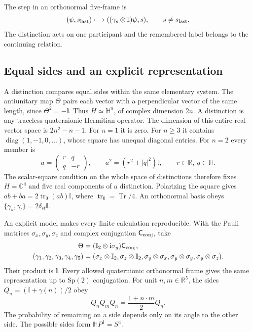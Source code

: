 \documentclass[aps,prx,onecolumn,10pt,notitlepage,nofootinbib,longbibliography]{revtex4-2}
\numberwithin{equation}{section}
\numberwithin{table}{section}
\newcommand{\Id}{\mathbb I}
\newcommand{\CC}{\mathbb C}
\newcommand{\RR}{\mathbb R}
\newcommand{\Tr}{\operatorname{Tr}}
\newcommand{\diag}{\operatorname{diag}}
\newcommand{\ii}{\mathrm i}
\newcommand{\trn}{\operatorname{tr}_0}
\begin{document}
The step in an orthonormal five-frame is
\begin{equation}
 (\psi,s_{\rm last})\longmapsto
 ((\gamma_s\otimes\Id)\psi,s),\qquad s\ne s_{\rm last}.
 \label{eq:postulatestep}
\end{equation}
The distinction acts on one participant and the remembered label belongs to the continuing relation.

\subsection{Equal sides and an explicit representation}
A distinction compares equal sides within the same elementary system. The antiunitary map $\Theta$ pairs each vector with a perpendicular vector of the same length, since $\Theta^2=-\Id$. Thus $H\simeq\mathbb H^n$, of complex dimension $2n$. A distinction is any traceless quaternionic Hermitian operator. The dimension of this entire real vector space is $2n^2-n-1$. For $n=1$ it is zero. For $n\geq3$ it contains $\diag(1,-1,0,\ldots)$, whose square has unequal diagonal entries. For $n=2$ every member is
\begin{equation}
 a=\begin{pmatrix}r&q\\\bar q&-r\end{pmatrix},\qquad
 a^2=(r^2+|q|^2)\Id,\qquad r\in\RR,\ q\in\mathbb H.
 \label{eq:quaternionic}
\end{equation}
The scalar-square condition on the whole space of distinctions therefore fixes $H=\CC^4$ and five real components of a distinction. Polarizing the square gives $ab+ba=2\trn(ab)\Id$, where $\trn=\Tr/4$. An orthonormal basis obeys $\{\gamma_s,\gamma_t\}=2\delta_{st}\Id$.

An explicit model makes every finite calculation reproducible. With the Pauli matrices $\sigma_x,\sigma_y,\sigma_z$ and complex conjugation ${\mathsf C_{\rm conj}}$, take
\begin{align}
 \Theta&=(\Id_2\otimes\ii\sigma_y){\mathsf C_{\rm conj}},\notag\\
 (\gamma_1,\gamma_2,\gamma_3,\gamma_4,\gamma_5)
 &=(\sigma_x\otimes\Id_2,\sigma_z\otimes\Id_2,
 \sigma_y\otimes\sigma_x,\sigma_y\otimes\sigma_y,\sigma_y\otimes\sigma_z).
 \label{eq:explicitclifford}
\end{align}
Their product is $\Id$. Every allowed quaternionic orthonormal frame gives the same representation up to $\mathrm{Sp}(2)$ conjugation. For unit $n,m\in\RR^5$, the sides $Q_n=(\Id+\gamma(n))/2$ obey
\begin{equation}
 Q_nQ_mQ_n=\frac{1+n\cdot m}{2}Q_n.\label{eq:sideoverlap}
\end{equation}
The probability of remaining on a side depends only on its angle to the other side. The possible sides form $\mathbb HP^1=S^4$.
\end{document}
